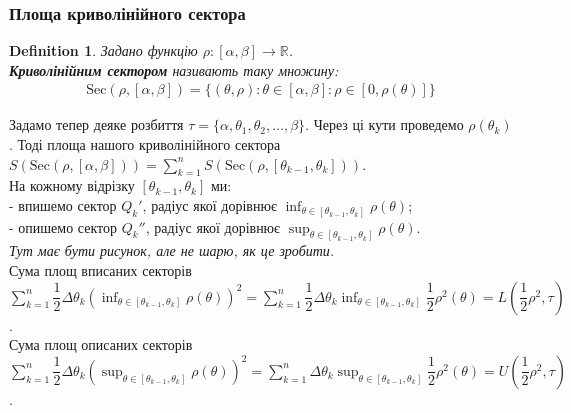 \documentclass[a4paper, 10pt]{article}
\def\huge{\displaystyle}
\theoremstyle{theoremdd}
\theoremstyle{theoremdd}
\theoremstyle{theoremdd}
\newtheorem{definition}[theorem]{Definition}
\theoremstyle{theoremdd}
\theoremstyle{theoremdd}
\theoremstyle{theoremdd}
\theoremstyle{theoremdd}
\theoremstyle{theoremdd}
\theoremstyle{theoremdd}
\begin{document}
\subsubsection{Площа криволінійного сектора}
\begin{definition}
Задано функцію $\rho \colon [\alpha, \beta] \to \mathbb{R}$.\\
\textbf{Криволінійним сектором} називають таку множину:
\begin{align*}
\text{Sec}(\rho,[\alpha,\beta]) = \{(\theta,\rho) : \theta \in [\alpha,\beta]: \rho \in [0,\rho(\theta)] \}
\end{align*}
\begin{figure}[H]
\centering
{}
\end{figure}
\end{definition}
Задамо тепер деяке розбиття $\tau = \{\alpha, \theta_1,\theta_2,\dots,\beta \}$. Через ці кути проведемо $\rho(\theta_k)$. Тоді площа нашого криволінійного сектора $S(\text{Sec}(\rho,[\alpha,\beta])) =\huge\sum_{k=1}^n S(\text{Sec}(\rho, [\theta_{k-1}, \theta_k]))$.\\
На кожному відрізку $[\theta_{k-1}, \theta_k]$ ми:\\
- впишемо сектор $Q_k'$, радіус якої дорівнює $\huge\inf_{\theta \in [\theta_{k-1}, \theta_k]} \rho(\theta)$;\\
- опишемо сектор $Q_k''$, радіус якої дорівнює $\huge\sup_{\theta \in [\theta_{k-1}, \theta_k]} \rho(\theta)$.\\
\textit{Тут має бути рисунок, але не шарю, як це зробити.}\\
Сума площ вписаних секторів $\huge\sum_{k=1}^n \dfrac{1}{2} \Delta \theta_k \huge \left(\inf_{\theta \in [\theta_{k-1}, \theta_k]} \rho(\theta) \right)^2 = \huge\sum_{k=1}^n \dfrac{1}{2} \Delta \theta_k \huge \inf_{\theta \in [\theta_{k-1}, \theta_k]} \dfrac{1}{2} \rho^2(\theta) = L \left( \dfrac{1}{2} \rho^2, \tau \right)$.\\
Сума площ описаних секторів $\huge\sum_{k=1}^n \dfrac{1}{2} \Delta \theta_k \huge \left(\sup_{\theta \in [\theta_{k-1}, \theta_k]} \rho(\theta) \right)^2 = \huge\sum_{k=1}^n \Delta \theta_k \huge \sup_{\theta \in [\theta_{k-1}, \theta_k]} \dfrac{1}{2} \rho^2(\theta) = U \left( \dfrac{1}{2} \rho^2, \tau \right)$.
\end{document}
